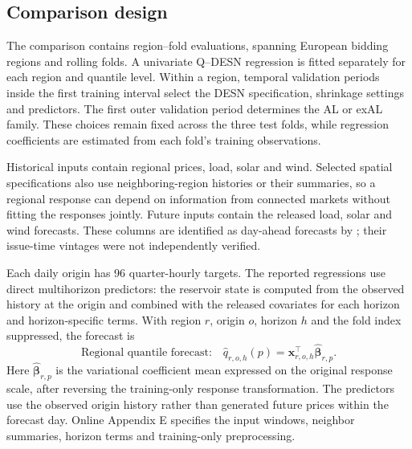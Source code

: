 \documentclass[12pt,letterpaper]{article}
\numberwithin{equation}{section}
\newcommand{\vect}[1]{\bm{#1}}
\begin{document}
\subsection{Comparison design}

The comparison contains \PricefmFullRegionFolds{} region--fold evaluations,
spanning \PricefmFullRegions{} European bidding regions and
\PricefmFullFolds{} rolling folds. A univariate Q--DESN regression is fitted
separately for each region and quantile level. Within a region, temporal
validation periods inside the first training interval select the DESN
specification, shrinkage settings and predictors. The first outer validation
period determines the AL or exAL family. These choices remain fixed across
the three test folds, while regression coefficients are estimated from each
fold's training observations.

Historical inputs contain regional prices, load, solar and wind. Selected
spatial specifications also use neighboring-region histories or their
summaries, so a regional response can depend on information from connected
markets without fitting the responses jointly. Future inputs contain the
released load, solar and wind forecasts. These columns are identified as
day-ahead forecasts by \citet{YuEtAl2026PriceFM}; their issue-time vintages
were not independently verified.

Each daily origin has 96 quarter-hourly targets. The reported regressions
use direct multihorizon predictors: the reservoir state is computed from
the observed history at the origin and combined with the released covariates
for each horizon and horizon-specific terms. With region \(r\), origin
\(o\), horizon \(h\) and the fold index suppressed, the forecast is
\begin{equation}
\text{Regional quantile forecast:}\quad
\widehat q_{r,o,h}(p)
=\vect x_{r,o,h}^{\top}\widehat{\vect\beta}_{r,p}.
\label{eq:pricefm-regional-forecast-main}
\end{equation}
Here \(\widehat{\vect\beta}_{r,p}\) is the variational coefficient mean
expressed on the original response scale, after reversing the training-only
response transformation.
The predictors use the observed origin history rather than generated future
prices within the forecast day. Online Appendix E specifies the input windows,
neighbor summaries, horizon terms and training-only preprocessing.
\end{document}
